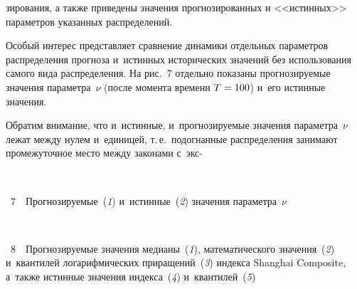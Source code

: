 \begin{multicols}{2}



\noindent
зирования, а также приведены значения
прогнозированных и <<истинных>> параметров указанных распределений.



Особый интерес представляет сравнение динамики отдельных параметров
распределения прогноза и~истинных исторических значений без
использования самого вида распределения. На рис.~7 отдельно показаны
прогнозируемые значения параметра~$\nu$ (после момента времени
$T\hm=100$) и~его истинные значения. 

Обратим внимание, что и~истинные,
и~прогнозируемые значения па\-ра\-мет\-ра~$\nu$ лежат между нулем 
и~единицей, т.\,е.\ подогнанные распределения занимают промежуточное
место между законами с~экс-\linebreak\vspace*{-12pt}

\begin{center}  %
\vspace*{-6pt}
\mbox{%
 \epsfxsize=77.88mm
 }

\end{center}


\noindent
{{\figurename~7}\ \ \small{Прогнозируемые~(\textit{1}) и~истинные~(\textit{2}) значения параметра~$\nu$}}
 


\vspace*{6pt}


\addtocounter{figure}{1}



\begin{center}  %
\vspace*{-1pt}
\mbox{%
 \epsfxsize=78.102mm
 }

\end{center}


\noindent
{{\figurename~8}\ \ \small{Прогнозируемые значения медианы~(\textit{1}),
математического значения~(\textit{2}) и~квантилей логарифмических приращений~(\textit{3})
индекса Shanghai Composite, а~также истинные значения индекса~(\textit{4}) и~квантилей~(\textit{5})}}
 


\vspace*{17pt}



\end{multicols}
